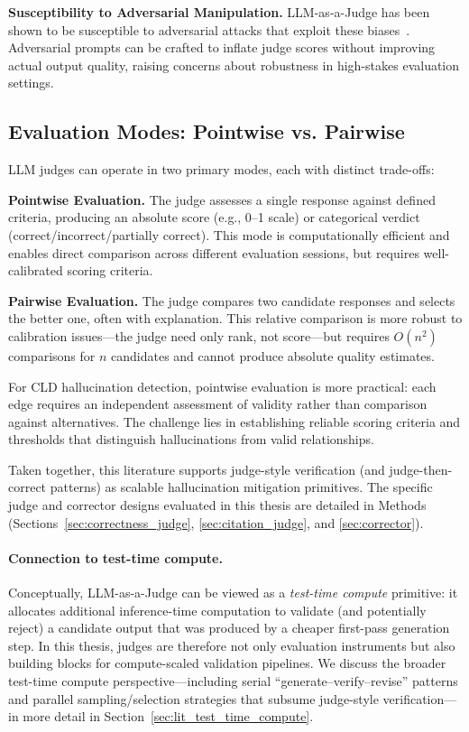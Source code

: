 \textbf{Susceptibility to Adversarial Manipulation.} LLM-as-a-Judge has been shown to be susceptible to adversarial attacks that exploit these biases~\citep{shi2024optimization, li2024llmsjudges}. Adversarial prompts can be crafted to inflate judge scores without improving actual output quality, raising concerns about robustness in high-stakes evaluation settings.

\subsection{Evaluation Modes: Pointwise vs. Pairwise}

LLM judges can operate in two primary modes, each with distinct trade-offs:

\textbf{Pointwise Evaluation.} The judge assesses a single response against defined criteria, producing an absolute score (e.g., 0--1 scale) or categorical verdict (correct/incorrect/partially correct). This mode is computationally efficient and enables direct comparison across different evaluation sessions, but requires well-calibrated scoring criteria.

\textbf{Pairwise Evaluation.} The judge compares two candidate responses and selects the better one, often with explanation. This relative comparison is more robust to calibration issues---the judge need only rank, not score---but requires $O(n^2)$ comparisons for $n$ candidates and cannot produce absolute quality estimates.

For CLD hallucination detection, pointwise evaluation is more practical: each edge requires an independent assessment of validity rather than comparison against alternatives. The challenge lies in establishing reliable scoring criteria and thresholds that distinguish hallucinations from valid relationships.

\noindent Taken together, this literature supports judge-style verification (and judge-then-correct patterns) as scalable hallucination mitigation primitives. The specific judge and corrector designs evaluated in this thesis are detailed in Methods (Sections~\ref{sec:correctness_judge}, \ref{sec:citation_judge}, and \ref{sec:corrector}).

\paragraph{Connection to test-time compute.}
Conceptually, LLM-as-a-Judge can be viewed as a \emph{test-time compute} primitive: it allocates additional inference-time computation to validate (and potentially reject) a candidate output that was produced by a cheaper first-pass generation step. In this thesis, judges are therefore not only evaluation instruments but also building blocks for compute-scaled validation pipelines. We discuss the broader test-time compute perspective---including serial ``generate--verify--revise'' patterns and parallel sampling/selection strategies that subsume judge-style verification---in more detail in Section~\ref{sec:lit_test_time_compute}.

